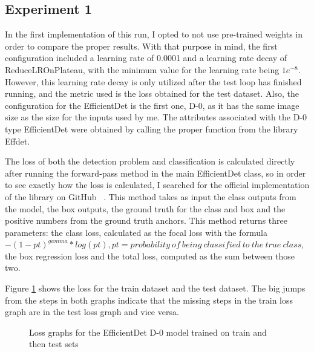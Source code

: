 \subsection{Experiment 1}

In the first implementation of this run, I opted to not use pre-trained weights in order to compare the proper results. With that purpose in mind, the first configuration included a learning rate of 0.0001 and a learning rate decay of ReduceLROnPlateau, with the minimum value for the learning rate being $1e^{-8}$. However, this learning rate decay is only utilized after the test loop has finished running, and the metric used is the loss obtained for the test dataset. Also, the configuration for the EfficientDet is the first one, D-0, as it has the same image size as the size for the inputs used by me. The attributes associated with the D-0 type EfficientDet were obtained by calling the proper function from the library Effdet.

The loss of both the detection problem and classification is calculated directly after running the forward-pass method in the main EfficientDet class, so in order to see exactly how the loss is calculated, I searched for the official implementation of the library on GitHub ~\cite{link7}. This method takes as input the class outputs from the model, the box outputs, the ground truth for the class and box and the positive numbers from the ground truth anchors. This method returns three parameters: the class loss, calculated as the focal loss with the formula $-(1-pt)^{gamma} * log(pt), pt=probability\ of\ being\ classified\ to\ the\ true\ class$, the box regression loss and the total loss, computed as the sum between those two.

Figure \ref{fig:fig23} shows the loss for the train dataset and the test dataset. The big jumps from the steps in both graphs indicate that the missing steps in the train loss graph are in the test loss graph and vice versa. 

\begin{figure}[!ht]
    \caption{Loss graphs for the EfficientDet D-0 model trained on train and then test sets}
    \label{fig:fig23}
\end{figure}

